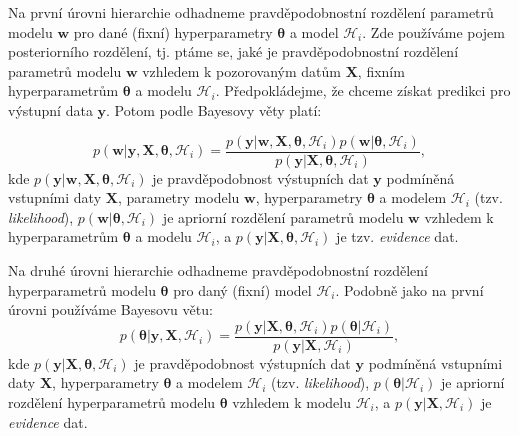 Na první úrovni hierarchie odhadneme pravděpodobnostní rozdělení parametrů modelu $\mathbf{w}$ pro dané (fixní) hyperparametry $\boldsymbol{\theta}$ a model $\mathcal{H}_i$.
Zde používáme pojem posteriorního rozdělení, tj. ptáme se, jaké je pravděpodobnostní rozdělení parametrů modelu $\mathbf{w}$ vzhledem k pozorovaným datům $\mathbf{X}$, fixním hyperparametrům $\boldsymbol{\theta}$ a modelu $\mathcal{H}_i$.
Předpokládejme, že chceme získat predikci pro výstupní data $\mathbf{y}$.
Potom podle Bayesovy věty platí:

\begin{equation}
  p(\mathbf{w} | \mathbf{y}, \mathbf{X}, \boldsymbol{\theta}, \mathcal{H}_i) = \frac{p( \mathbf{y} | \mathbf{w}, \mathbf{X}, \boldsymbol{\theta}, \mathcal{H}_i) p(\mathbf{w} | \boldsymbol{\theta}, \mathcal{H}_i)}{p(\mathbf{y} |\mathbf{X}, \boldsymbol{\theta}, \mathcal{H}_i)},     
\end{equation}
kde $p( \mathbf{y} | \mathbf{w}, \mathbf{X}, \boldsymbol{\theta}, \mathcal{H}_i)$ je pravděpodobnost výstupních dat $\mathbf{y}$ podmíněná vstupními daty $\mathbf{X}$, parametry modelu $\mathbf{w}$, hyperparametry $\boldsymbol{\theta}$ a modelem $\mathcal{H}_i$ (tzv. \emph{likelihood}), $p(\mathbf{w} | \boldsymbol{\theta}, \mathcal{H}_i)$ je apriorní rozdělení parametrů modelu $\mathbf{w}$ vzhledem k hyperparametrům $\boldsymbol{\theta}$ a modelu $\mathcal{H}_i$, a $p(\mathbf{y} |\mathbf{X}, \boldsymbol{\theta}, \mathcal{H}_i)$ je tzv. \emph{evidence} dat.
\par

Na druhé úrovni hierarchie odhadneme pravděpodobnostní rozdělení hyperparametrů modelu $\boldsymbol{\theta}$ pro daný (fixní) model $\mathcal{H}_i$.
Podobně jako na první úrovni používáme Bayesovu větu:
\begin{equation}
  p(\boldsymbol{\theta} | \mathbf{y}, \mathbf{X}, \mathcal{H}_i) = \frac{p( \mathbf{y} | \mathbf{X}, \boldsymbol{\theta}, \mathcal{H}_i) p(\boldsymbol{\theta} | \mathcal{H}_i)}{p(\mathbf{y} |\mathbf{X}, \mathcal{H}_i)},     
  \label{eq:2_uroven}
\end{equation}
kde $p( \mathbf{y} | \mathbf{X}, \boldsymbol{\theta}, \mathcal{H}_i)$ je pravděpodobnost výstupních dat $\mathbf{y}$ podmíněná vstupními daty $\mathbf{X}$, hyperparametry $\boldsymbol{\theta}$ a modelem $\mathcal{H}_i$ (tzv. \emph{likelihood}), $p(\boldsymbol{\theta} | \mathcal{H}_i)$ je apriorní rozdělení hyperparametrů modelu $\boldsymbol{\theta}$
    vzhledem k modelu $\mathcal{H}_i$, a $p(\mathbf{y} |\mathbf{X}, \mathcal{H}_i)$ je \emph{evidence} dat.   
\par


